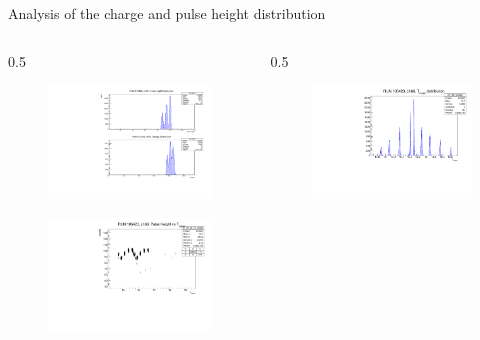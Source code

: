 \documentclass{beamer}[10pt]
\begin{document}
\begin{frame}{Analysis of the charge and pulse height distribution}
\begin{columns}
\begin{column}{0.5\framewidth}
\begin{figure}[H]
   \centering
   \includegraphics[width= .85\columnwidth]{figures/pdf/p.pdf}
   \label{fig:wffytl}
 \end{figure}
\vspace{-8mm}
\begin{figure}[H]
   \centering
   \includegraphics[width= .85\columnwidth]{figures/pdf/phtmean.pdf}
   \label{fig:wffytl}
 \end{figure}
\end{column}
\begin{column}{0.5\framewidth}
\begin{figure}[H]
   \centering
   \includegraphics[width= .82\columnwidth]{figures/pdf/tmean.pdf}

\end{figure}
\end{column}
\end{columns}
\end{frame}
\end{document}
